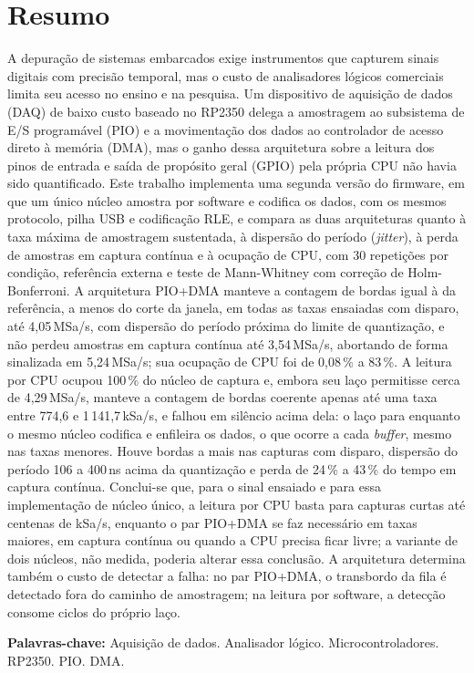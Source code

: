 \chapter*{Resumo}
\noindent
A depuração de sistemas embarcados exige instrumentos que capturem sinais
digitais com precisão temporal, mas o custo de analisadores lógicos
comerciais limita seu acesso no ensino e na pesquisa. Um dispositivo de
aquisição de dados (DAQ) de baixo custo baseado no RP2350 delega a amostragem ao subsistema de E/S programável (PIO)
e a movimentação dos dados ao controlador de acesso direto à memória (DMA),
mas o ganho dessa arquitetura sobre a leitura dos pinos de entrada e saída
de propósito geral (GPIO) pela própria CPU não havia sido quantificado. Este
trabalho implementa uma segunda versão do firmware, em que um único núcleo
amostra por software e codifica os dados, com os mesmos protocolo, pilha USB
e codificação RLE, e compara as duas arquiteturas quanto à taxa máxima de
amostragem sustentada, à dispersão do período (\emph{jitter}), à perda de
amostras em captura contínua e à ocupação de CPU, com 30 repetições por
condição, referência externa e teste de Mann-Whitney com correção de
Holm-Bonferroni. A arquitetura PIO+DMA manteve a
contagem de bordas igual à da referência, a menos do corte da janela, em todas
as taxas ensaiadas com disparo, até 4,05\,MSa/s, com dispersão do período
próxima do limite de quantização, e não perdeu amostras em captura contínua
até 3,54\,MSa/s, abortando de forma sinalizada em 5,24\,MSa/s; sua ocupação
de CPU foi de 0,08\,\% a 83\,\%. A leitura por CPU ocupou 100\,\% do núcleo de
captura e, embora seu laço permitisse cerca de 4,29\,MSa/s, manteve a
contagem de bordas coerente apenas até uma taxa entre 774,6 e
1\,141,7\,kSa/s, e falhou em silêncio acima dela: o laço para enquanto o mesmo
núcleo codifica e enfileira os dados, o que ocorre a cada \emph{buffer}, mesmo
nas taxas menores. Houve bordas a mais nas capturas com disparo, dispersão do
período 106 a 400\,ns acima da quantização e perda de 24\,\% a 43\,\% do
tempo em captura contínua. Conclui-se que, para o sinal
ensaiado e para essa implementação de núcleo único, a leitura por CPU basta
para capturas curtas até centenas de kSa/s, enquanto o par PIO+DMA se faz
necessário em taxas maiores, em captura contínua ou quando a CPU precisa ficar
livre; a variante de dois núcleos, não medida, poderia alterar essa conclusão.
A arquitetura determina também o custo de detectar a falha: no par PIO+DMA,
o transbordo da fila é detectado fora do caminho de amostragem; na leitura por
software, a detecção consome ciclos do próprio laço.

\vspace{2mm}
\noindent\textbf{Palavras-chave:} Aquisição de dados. Analisador lógico. Microcontroladores. RP2350. PIO. DMA.
